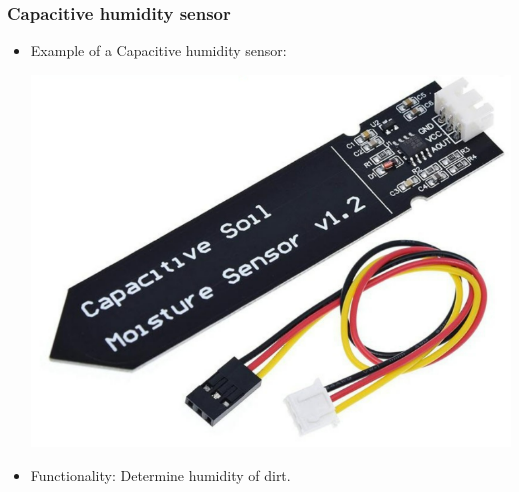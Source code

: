 \documentclass[12pt]{article}
\begin{document}
        \subsubsection{Capacitive humidity sensor}
            \begin{itemize}
                \item Example of a Capacitive humidity sensor:
                \begin{center}
                    \includegraphics[scale = 0.5]{./images/hum_sensor.png}
                \end{center}

                \item Functionality: Determine humidity of dirt.
            \end{itemize}
\end{document}
